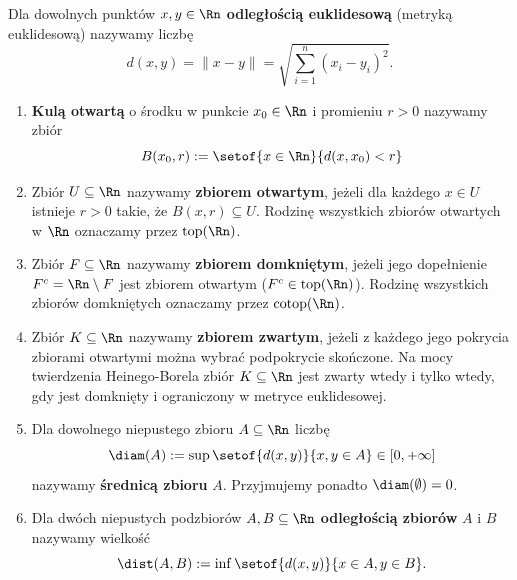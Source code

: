 \begin{defi}
    Dla dowolnych punktów $x, y \in \Rn$ \textbf{odległością euklidesową} (metryką euklidesową) nazywamy liczbę
    \begin{equation*}
        d(x, y) = \|x - y\| = \sqrt{\sum_{i=1}^n (x_i - y_i)^2}.
    \end{equation*}
    \begin{enumerate}
        \item \textbf{Kulą otwartą} o środku w punkcie $x_0 \in \Rn$ i promieniu $r > 0$ nazywamy zbiór
              \begin{equation*}
                  B(x_0, r) := \setof{x \in \Rn}{d(x, x_0) < r}
              \end{equation*}

        \item Zbiór $U \subseteq  \Rn$ nazywamy \textbf{zbiorem otwartym}, jeżeli dla każdego $x \in U$ istnieje $r > 0$ takie, że $B(x, r) \subseteq  U$.
              Rodzinę wszystkich zbiorów otwartych w $\Rn$ oznaczamy przez $\mathrm{top}(\Rn)$.

        \item Zbiór $F \subseteq  \Rn$ nazywamy \textbf{zbiorem domkniętym}, jeżeli jego dopełnienie $F^c = \Rn \setminus F$ jest zbiorem otwartym ($F^c \in \mathrm{top}(\Rn)$).
              Rodzinę wszystkich zbiorów domkniętych oznaczamy przez $\mathrm{cotop}(\Rn)$.

        \item Zbiór $K \subseteq  \Rn$ nazywamy \textbf{zbiorem zwartym}, jeżeli z każdego jego pokrycia zbiorami otwartymi można wybrać podpokrycie skończone. Na mocy twierdzenia Heinego-Borela zbiór $K \subseteq  \Rn$ jest zwarty wtedy i tylko wtedy, gdy jest domknięty i ograniczony w metryce euklidesowej.

        \item Dla dowolnego niepustego zbioru $A \subseteq \Rn$ liczbę
              \begin{equation*}
                  \diam(A) := \sup\setof{d(x, y)}{x, y \in A} \in [0, +\infty]
              \end{equation*} nazywamy \textbf{średnicą zbioru} $A$. Przyjmujemy ponadto $\diam(\emptyset) = 0$.
        \item Dla dwóch niepustych podzbiorów $A, B \subseteq \Rn$ \textbf{odległością zbiorów} $A$ i $B$ nazywamy wielkość
              \begin{equation*}
                  \dist(A, B) := \inf\setof{d(x, y)}{x \in A,  y \in B}.
              \end{equation*}
    \end{enumerate}
\end{defi}

